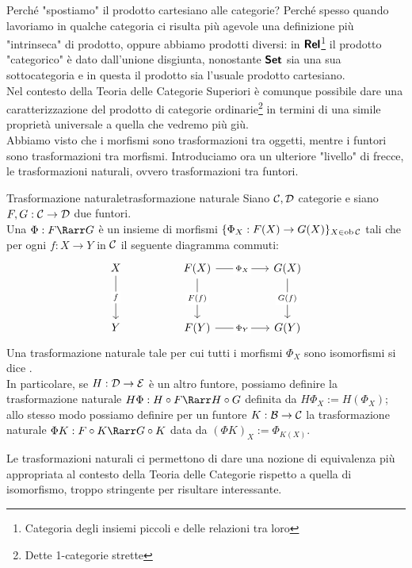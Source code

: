 \documentclass[openany]{book}
\renewcommand\C{\mc{C}}
\newcommand\D{\mc{D}}
\begin{document}
Perché "spostiamo" il prodotto cartesiano alle categorie? Perché spesso quando lavoriamo in qualche categoria ci risulta più agevole una definizione più "intrinseca" di prodotto, oppure abbiamo prodotti diversi: in $\text{\sffamily\textbf{Rel}}$\footnote{Categoria degli insiemi piccoli e delle relazioni tra loro} il prodotto "categorico" è dato dall'unione disgiunta, nonostante $\text{\sffamily\textbf{Set}}$ sia una sua sottocategoria e in questa il prodotto sia l'usuale prodotto cartesiano.\\
Nel contesto della Teoria delle Categorie Superiori è comunque possibile dare una caratterizzazione del prodotto di categorie ordinarie\footnote{Dette 1-categorie strette} in termini di una simile proprietà universale a quella che vedremo più giù.\\
Abbiamo visto che i morfismi sono trasformazioni tra oggetti, mentre i funtori sono trasformazioni tra morfismi. Introduciamo ora un ulteriore "livello" di frecce, le trasformazioni naturali, ovvero trasformazioni tra funtori.

\begin{definition}{Trasformazione naturale}{trasformazione naturale}
    Siano $\C,\D$ categorie e siano $F,G : \C\to\D $ due funtori.\\
    Una  $\Phi:F\Rarr G$ è un insieme di morfismi $\{\Phi_X : F(X)\to G(X)\}_{X\in\ob\C}$ tali che per ogni $f:X\to Y$ in $\C$ il seguente diagramma commuti:
    \[\begin{tikzcd}
    	X && {F(X)} && {G(X)} \\
    	\\
    	Y && {F(Y)} && {G(Y)}
    	\arrow["f"{description}, from=1-1, to=3-1]
    	\arrow["{\Phi_X}"{description}, from=1-3, to=1-5]
    	\arrow["{F(f)}"{description}, from=1-3, to=3-3]
    	\arrow["{G(f)}"{description}, from=1-5, to=3-5]
	    \arrow["{\Phi_Y}"{description}, from=3-3, to=3-5]
    \end{tikzcd}\]
    Una trasformazione naturale tale per cui tutti i morfismi $\Phi_X$ sono isomorfismi si dice .\\
    In particolare, se $H:\D\to\mc{E}$ è un altro funtore, possiamo definire la trasformazione naturale $H\Phi : H\circ F \Rarr H\circ G$ definita da $H\Phi_X := H(\Phi_X)$; allo stesso modo possiamo definire per un funtore $K:\B\to\C$ la trasformazione naturale $\Phi K : F\circ K \Rarr G\circ K$ data da $(\Phi K)_X := \Phi_{K(X)}$.
\end{definition}

Le trasformazioni naturali ci permettono di dare una nozione di equivalenza più appropriata al contesto della Teoria delle Categorie rispetto a quella di isomorfismo, troppo stringente per risultare interessante. 
\end{document}
